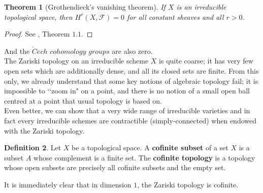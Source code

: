\documentclass{article}
\theoremstyle{plain}
\newtheorem{theorem}{Theorem}[subsection]
\theoremstyle{definition}
\newtheorem{definition}[theorem]{Definition}
\begin{document}
\begin{theorem}[Grothendieck's vanishing theorem]
    If $X$ is an irreducible topological space, then $H^r(X,\mathcal{F}) = 0$ for all constant sheaves and all $r>0$. 
\end{theorem}
\begin{proof}
    See \cite{milneEtCoH}, Theorem $1.1$.
\end{proof}

\noindent And the $\check{C}ech$ $cohomology$ $groups$ are also zero.\\
The Zariski topology on an irreducible scheme $X$ is quite coarse; it has very few open sets which are additionally dense, and all its closed sets are finite. 
From this only, we already understand that some key notions of algebraic topology fail; 
it is impossible to ‘‘zoom in" on a point, and 
there is no notion of a small open ball centred at a point that usual topology is based on.\\
Even better, we can show that a very wide range of irreducible varieties and in fact every irreducible schemes are contractible (simply-connected) when endowed with the Zariski topology. 



\begin{definition}
    Let $X$ be a topological space.
    A \textbf{cofinite subset} of a set $X$ is a subset $A$ whose complement is a finite set.
    The \textbf{cofinite topology} is a topology whose open subsets are precisely all cofinite subsets and the empty set.
\end{definition}

\noindent It is immediately clear that in dimension $1$, the Zariski topology is cofinite.
\end{document}
